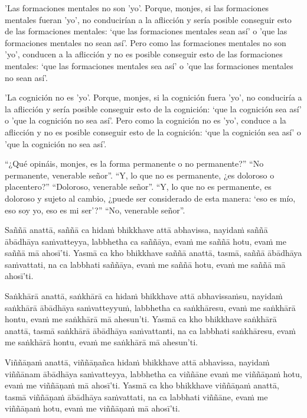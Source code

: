 'Las formaciones mentales no son 'yo'. Porque, monjes, si las formaciones mentales fueran 'yo', no conducirían a la aflicción y sería posible conseguir esto de las formaciones mentales: ‘que las formaciones mentales sean así' o 'que las formaciones mentales no sean así’. Pero como las formaciones mentales no son 'yo', conducen a la aflicción y no es posible conseguir esto de las formaciones mentales: ‘que las formaciones mentales sea así' o 'que las formaciones mentales no sean así’.

'La cognición no es 'yo'. Porque, monjes, si la cognición fuera 'yo', no conduciría a la aflicción y sería posible conseguir esto de la cognición: ‘que la cognición sea así' o 'que la cognición no sea así’. Pero como la cognición no es 'yo', conduce a la aflicción y no es posible conseguir esto de la cognición: ‘que la cognición sea así' o 'que la cognición no sea así’.

“¿Qué opináis, monjes, es la forma permanente o no permanente?”
“No permanente, venerable señor”.
“Y, lo que no es permanente, ¿es doloroso o placentero?”
“Doloroso, venerable señor”.
“Y, lo que no es permanente, es doloroso y sujeto al cambio, ¿puede ser considerado de esta manera: ‘eso es mío, eso soy yo, eso es mi ser’?”
“No, venerable señor”.



\clearpage

\paliText
\markboth{\paliTitle}{\rightmark}

Saññā anattā, saññā ca hidaṁ bhikkhave attā abhavissa, nayidaṁ saññā ābādhāya
saṁvatteyya, labbhetha ca saññāya, evaṁ me saññā hotu, evaṁ me saññā mā
ahosī'ti. Yasmā ca kho bhikkhave saññā anattā, tasmā, saññā ābādhāya saṁvattati,
na ca labbhati saññāya, evaṁ me saññā hotu, evaṁ me saññā mā ahosī'ti.

Saṅkhārā anattā, saṅkhārā ca hidaṁ bhikkhave attā abhavissaṁsu, nayidaṁ saṅkhārā
ābādhāya saṁvatteyyuṁ, labbhetha ca saṅkhāresu, evaṁ me saṅkhārā hontu, evaṁ me
saṅkhārā mā ahesun'ti. Yasmā ca kho bhikkhave saṅkhārā anattā, tasmā saṅkhārā
ābādhāya saṁvattanti, na ca labbhati saṅkhāresu, evaṁ me saṅkhārā hontu, evaṁ me
saṅkhārā mā ahesun'ti.

Viññāṇaṁ anattā, viññāṇañca hidaṁ bhikkhave attā abhavissa, nayidaṁ viññānam
ābādhāya saṁvatteyya, labbhetha ca viññāne evaṁ me viññāṇaṁ hotu, evaṁ me
viññāṇaṁ mā ahosī'ti. Yasmā ca kho bhikkhave viññāṇaṁ anattā, tasmā viññāṇaṁ
ābādhāya saṁvattati, na ca labbhati viññāne, evaṁ me viññāṇaṁ hotu, evaṁ me
viññāṇaṁ mā ahosī'ti.

